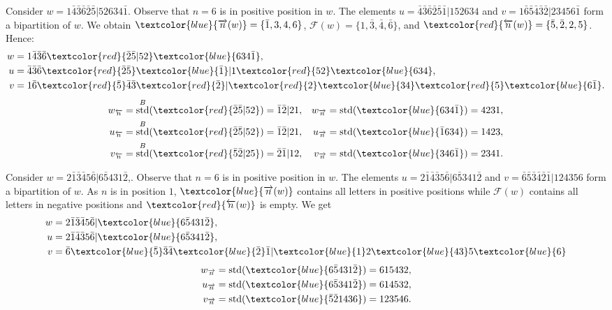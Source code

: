 \documentclass[ALCO,Unicode]{cedram}
\theoremstyle{definition}
\DeclareMathOperator{\std}{std}
\newcommand{\R}{{\overrightarrow{n}}}
\newcommand{\LL}{{\overleftarrow{n}}}
\newcommand{\Bstd}{\std^{B}}
\newcommand{\F}{\mathcal{F}}
\newcommand{\red}[1]{\textcolor{red}{#1}}
\newcommand{\blue}[1]{\textcolor{blue}{#1}}
\begin{document}
\begin{ex}
\label{ex:typeB-pos2}
Consider $w = 1 \bar{4} \bar{3} \bar{6} \bar{2} \bar{5} | 5 2 6 3 4 \bar{1}$. Observe that $n=6$ is in positive position in $w$. The elements $u = \bar{4} \bar{3} \bar{6} \bar{2} \bar{5} \bar{1} | 1 5 2 6 3 4$ and $v = 1 \bar{6} \bar{5} \bar{4} \bar{3} \bar{2} | 2 3 4 5 6 \bar{1}$ form a bipartition of $w$. We obtain $\blue{\R(w)} = \lbrace \bar{1}, 3, 4, 6 \rbrace$, $\F(w) = \lbrace 1, \bar{3}, \bar{4}, \bar{6} \rbrace$, and $\red{\LL(w)} = \lbrace \bar{5}, \bar{2}, 2, 5 \rbrace$. Hence: 
\begin{align*}
w &= 1 \bar{4} \bar{3} \bar{6}\red{ \bar{2} \bar{5} | 5 2} \blue{ 6 3 4 \bar{1}} ,\\
u &= \bar{4} \bar{3} \bar{6} \red{\bar{2} \bar{5}} \blue{\bar{1}} | 1 \red{5 2} \blue{ 6 3 4} ,\\
v &= 1 \bar{6} \red{\bar{5}} \bar{4} \bar{3} \red{\bar{2}} | \red{2} \blue{3 4} \red{5} \blue{ 6 \bar{1}}.
\end{align*}
\begin{align*}
w_\LL &= \Bstd(\red{\bar{2} \bar{5} | 5 2}) = \bar{1} \bar{2} | 2 1, & w_\R &= \std(\blue{6 3 4 \bar{1}}) = 4 2 3 1, \\
u_\LL &= \Bstd(\red{\bar{2} \bar{5} | 5 2}) = \bar{1} \bar{2} | 2 1, & u_\R &= \std(\blue{\bar{1} 6 3 4}) = 1 4 2 3 ,\\
v_\LL &= \Bstd(\red{\bar{5} \bar{2} | 2 5}) = \bar{2} \bar{1} | 1 2, & v_\R &= \std(\blue{3 4 6 \bar{1}}) = 2 3 4 1. 
\end{align*}
\end{ex}

\begin{ex}
\label{ex:typeB-pos3}
Consider $w = 2 \bar{1} \bar{3} \bar{4} 5 \bar{6} | 6 \bar{5} 4 3 1 \bar{2}$,. Observe that $n=6$ is in positive position in $w$. The elements  $u = 2 \bar{1} \bar{4} \bar{3} 5 \bar{6} | 6 \bar{5} 3 4 1 \bar{2}$ and $v = \bar{6} \bar{5} \bar{3} \bar{4} \bar{2} \bar{1} | 1 2 4 3 5 6$ form a bipartition of $w$.  As $n$ is in position $1$, $\blue{\R(w)}$ contains all letters in positive positions while $\F(w)$ contains all letters in negative positions and $\red{\LL(w)}$ is empty. We get
\begin{align*}
w &= 2 \bar{1} \bar{3} \bar{4} 5 \bar{6} | \blue{6 \bar{5} 4 3 1 \bar{2}}, \\
u &= 2 \bar{1} \bar{4} \bar{3} 5 \bar{6} | \blue{6 \bar{5} 3 4 1 \bar{2}} ,\\
v &= \bar{6} \blue{\bar{5}} \bar{3} \bar{4} \blue{\bar{2}} \bar{1} |  \blue{1} 2 \blue{ 4 3 } 5 \blue{ 6}
\end{align*}
\begin{align*}
w_\R &= \std(\blue{6 \bar{5} 4 3 1 \bar{2}}) = 6 1 5 4 3 2, \\
u_\R &= \std(\blue{6 \bar{5} 3 4 1 \bar{2}}) = 6 1 4 5 3 2 ,\\
v_\R &= \std(\blue{\bar{5} \bar{2} 1 4 3 6}) = 1 2 3 5 4 6. 
\end{align*}
\end{ex}
\end{document}
